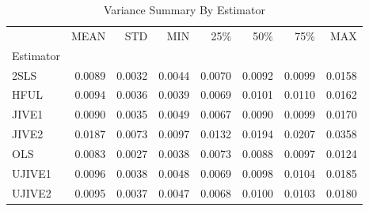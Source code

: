 \begin{table}[ht]
\centering
\caption{Variance Summary By Estimator}
\begin{tabular}{lrrrrrrr}
\toprule
 & MEAN & STD & MIN & 25\% & 50\% & 75\% & MAX \\
Estimator &  &  &  &  &  &  &  \\
\midrule
2SLS & 0.0089 & 0.0032 & 0.0044 & 0.0070 & 0.0092 & 0.0099 & 0.0158 \\
HFUL & 0.0094 & 0.0036 & 0.0039 & 0.0069 & 0.0101 & 0.0110 & 0.0162 \\
JIVE1 & 0.0090 & 0.0035 & 0.0049 & 0.0067 & 0.0090 & 0.0099 & 0.0170 \\
JIVE2 & 0.0187 & 0.0073 & 0.0097 & 0.0132 & 0.0194 & 0.0207 & 0.0358 \\
OLS & 0.0083 & 0.0027 & 0.0038 & 0.0073 & 0.0088 & 0.0097 & 0.0124 \\
UJIVE1 & 0.0096 & 0.0038 & 0.0048 & 0.0069 & 0.0098 & 0.0104 & 0.0185 \\
UJIVE2 & 0.0095 & 0.0037 & 0.0047 & 0.0068 & 0.0100 & 0.0103 & 0.0180 \\
\bottomrule
\end{tabular}
\end{table}
